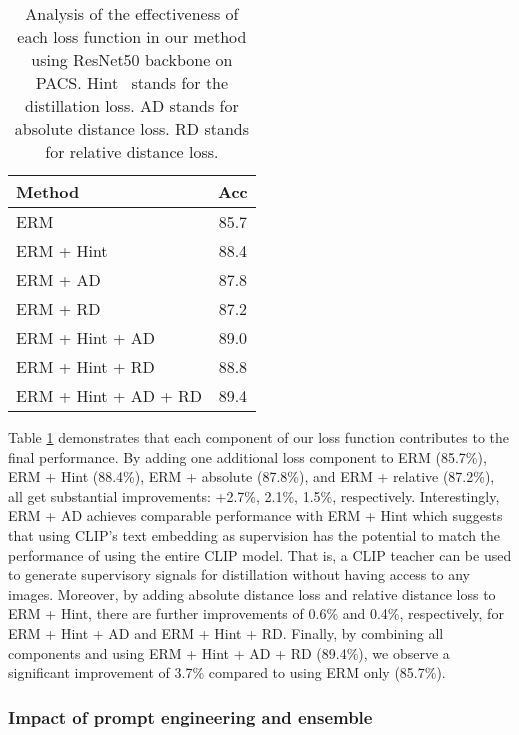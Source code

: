 \documentclass[10pt,twocolumn,letterpaper]{article}
\begin{document}
\begin{table}[htbp]
\begin{center}
\footnotesize
\begin{tabular}{l | c }
\hline
Method  & Acc \\
\hline \hline
ERM & 85.7 \\
ERM + Hint &  88.4\\
ERM + AD & 87.8 \\
ERM + RD &  87.2\\
ERM + Hint + AD &  89.0\\
ERM + Hint + RD &  88.8\\
\rowcolor{lightgray!30}ERM + Hint + AD + RD & 89.4\\
\hline
\end{tabular}
\vspace{5pt}
\caption{Analysis of the effectiveness of each loss function in our method using ResNet50 backbone on PACS. Hint~\cite{hinton2015distilling} stands for the distillation loss. AD stands for absolute distance loss. RD stands for relative distance loss.}
\label{table:eachloss}
\end{center}
\end{table}

Table \ref{table:eachloss} demonstrates that each component of our loss function contributes to the final performance. By adding one additional loss component to ERM (85.7\%), ERM + Hint (88.4\%), ERM + absolute (87.8\%), and ERM + relative (87.2\%), all get substantial improvements: +2.7\%, 2.1\%, 1.5\%, respectively. Interestingly, ERM + AD achieves comparable performance with ERM + Hint which suggests that using CLIP's text embedding as supervision has the potential to match the performance of using the entire CLIP model. That is, a CLIP teacher can be used to generate supervisory signals for distillation without having access to any images. 
Moreover, by adding absolute distance loss and relative distance loss to ERM + Hint, there are further improvements of 0.6\% and 0.4\%, respectively, for ERM + Hint + AD and ERM + Hint + RD. Finally, by combining all components and using ERM + Hint + AD + RD (89.4\%), we observe a significant improvement of 3.7\% compared to using ERM only (85.7\%).




\subsubsection{Impact of prompt engineering and ensemble}
\end{document}
